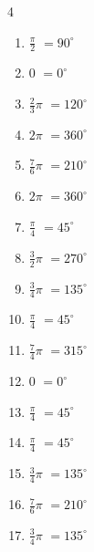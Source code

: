 \begin{multicols}{4}
\begin{enumerate}
  \item $\displaystyle \frac{\pi}{2}$
        $\displaystyle =90^{\circ}$

  \item $\displaystyle 0$
        $\displaystyle =0^{\circ}$

  \item $\displaystyle \frac{2}{3}\pi$
        $\displaystyle =120^{\circ}$

  \item $\displaystyle 2\pi$
        $\displaystyle =360^{\circ}$

  \item $\displaystyle \frac{7}{6}\pi$
        $\displaystyle =210^{\circ}$

  \item $\displaystyle 2\pi$
        $\displaystyle =360^{\circ}$

  \item $\displaystyle \frac{\pi}{4}$
        $\displaystyle =45^{\circ}$

  \item $\displaystyle \frac{3}{2}\pi$
        $\displaystyle =270^{\circ}$

  \item $\displaystyle \frac{3}{4}\pi$
        $\displaystyle =135^{\circ}$

  \item $\displaystyle \frac{\pi}{4}$
        $\displaystyle =45^{\circ}$

  \item $\displaystyle \frac{7}{4}\pi$
        $\displaystyle =315^{\circ}$

  \item $\displaystyle 0$
        $\displaystyle =0^{\circ}$

  \item $\displaystyle \frac{\pi}{4}$
        $\displaystyle =45^{\circ}$

  \item $\displaystyle \frac{\pi}{4}$
        $\displaystyle =45^{\circ}$

  \item $\displaystyle \frac{3}{4}\pi$
        $\displaystyle =135^{\circ}$

  \item $\displaystyle \frac{7}{6}\pi$
        $\displaystyle =210^{\circ}$

  \item $\displaystyle \frac{3}{4}\pi$
        $\displaystyle =135^{\circ}$


\end{enumerate}
\end{multicols}
